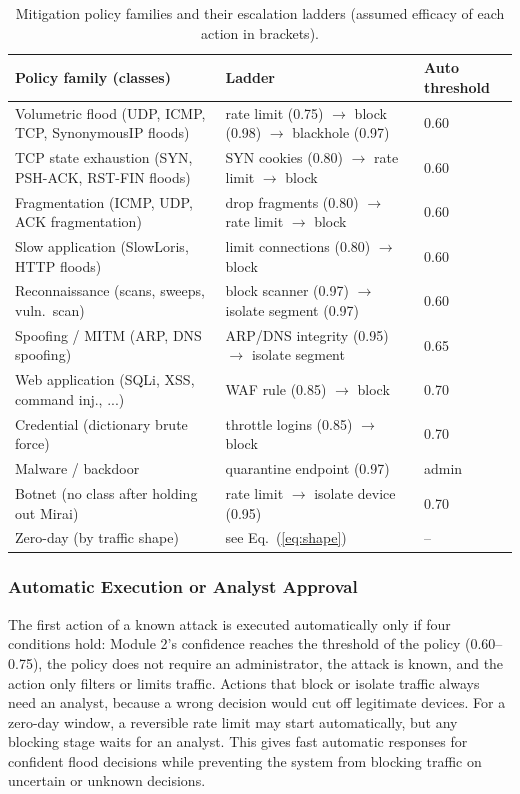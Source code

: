 \documentclass[]{interact}
\theoremstyle{plain}%
\theoremstyle{definition}
\theoremstyle{remark}
\begin{document}
\begin{table}[h]
\centering
\caption{Mitigation policy families and their escalation ladders (assumed efficacy of each action in brackets).}
\label{tab:playbooks}
\small
\begin{tabular}{lll}
\toprule
Policy family (classes) & Ladder & Auto threshold \\
\midrule
Volumetric flood (UDP, ICMP, TCP, SynonymousIP floods) & rate limit (0.75) $\rightarrow$ block (0.98) $\rightarrow$ blackhole (0.97) & 0.60 \\
TCP state exhaustion (SYN, PSH-ACK, RST-FIN floods) & SYN cookies (0.80) $\rightarrow$ rate limit $\rightarrow$ block & 0.60 \\
Fragmentation (ICMP, UDP, ACK fragmentation) & drop fragments (0.80) $\rightarrow$ rate limit $\rightarrow$ block & 0.60 \\
Slow application (SlowLoris, HTTP floods) & limit connections (0.80) $\rightarrow$ block & 0.60 \\
Reconnaissance (scans, sweeps, vuln.\ scan) & block scanner (0.97) $\rightarrow$ isolate segment (0.97) & 0.60 \\
Spoofing / MITM (ARP, DNS spoofing) & ARP/DNS integrity (0.95) $\rightarrow$ isolate segment & 0.65 \\
Web application (SQLi, XSS, command inj., ...) & WAF rule (0.85) $\rightarrow$ block & 0.70 \\
Credential (dictionary brute force) & throttle logins (0.85) $\rightarrow$ block & 0.70 \\
Malware / backdoor & quarantine endpoint (0.97) & admin \\
Botnet (no class after holding out Mirai) & rate limit $\rightarrow$ isolate device (0.95) & 0.70 \\
Zero-day (by traffic shape) & see Eq.~(\ref{eq:shape}) & -- \\
\bottomrule
\end{tabular}
\end{table}

\subsubsection{Automatic Execution or Analyst Approval}
The first action of a known attack is executed automatically only if four conditions hold: Module 2's confidence reaches the threshold of the policy (0.60--0.75), the policy does not require an administrator, the attack is known, and the action only filters or limits traffic. Actions that block or isolate traffic always need an analyst, because a wrong decision would cut off legitimate devices. For a zero-day window, a reversible rate limit may start automatically, but any blocking stage waits for an analyst. This gives fast automatic responses for confident flood decisions while preventing the system from blocking traffic on uncertain or unknown decisions.
\end{document}
